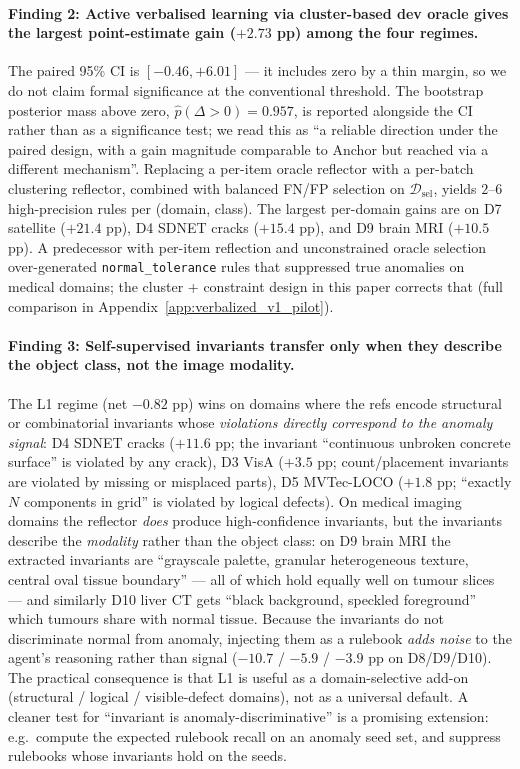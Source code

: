 \paragraph{Finding 2: Active verbalised learning via cluster-based
dev oracle gives the largest point-estimate gain ($+2.73$ pp) among
the four regimes.} The paired 95\% CI is $[-0.46, +6.01]$ --- it
includes zero by a thin margin, so we do not claim formal
significance at the conventional threshold. The bootstrap posterior
mass above zero, $\hat{p}(\Delta{>}0){=}0.957$, is reported
alongside the CI rather than as a significance test; we read this
as ``a reliable direction under the paired design, with a gain
magnitude comparable to Anchor but reached via a different
mechanism''. Replacing a per-item oracle reflector with a per-batch
clustering reflector, combined with balanced FN/FP selection on
$\mathcal{D}_{\mathrm{sel}}$, yields $2$--$6$ high-precision rules
per (domain, class). The largest per-domain gains are on D7
satellite ($+21.4$ pp), D4 SDNET cracks ($+15.4$ pp), and D9 brain
MRI ($+10.5$ pp). A predecessor with per-item reflection and
unconstrained oracle selection over-generated
\texttt{normal\_tolerance} rules that suppressed true anomalies on
medical domains; the cluster + constraint design in this paper
corrects that (full comparison in Appendix~\ref{app:verbalized_v1_pilot}).

\paragraph{Finding 3: Self-supervised invariants transfer only when
they describe the object class, not the image modality.} The L1
regime (net $-0.82$ pp) wins on domains where the refs encode
structural or combinatorial invariants whose \emph{violations
directly correspond to the anomaly signal}: D4 SDNET cracks
($+11.6$ pp; the invariant ``continuous unbroken concrete surface''
is violated by any crack), D3 VisA ($+3.5$ pp; count/placement
invariants are violated by missing or misplaced parts), D5
MVTec-LOCO ($+1.8$ pp; ``exactly $N$ components in grid'' is
violated by logical defects). On medical imaging domains the
reflector \emph{does} produce high-confidence invariants, but the
invariants describe the \emph{modality} rather than the object
class: on D9 brain MRI the extracted invariants are ``grayscale
palette, granular heterogeneous texture, central oval tissue
boundary'' --- all of which hold equally well on tumour slices ---
and similarly D10 liver CT gets ``black background, speckled
foreground'' which tumours share with normal tissue. Because the
invariants do not discriminate normal from anomaly, injecting them
as a rulebook \emph{adds noise} to the agent's reasoning rather
than signal ($-10.7$ / $-5.9$ / $-3.9$ pp on D8/D9/D10). The
practical consequence is that L1 is useful as a domain-selective
add-on (structural / logical / visible-defect domains), not as a
universal default. A cleaner test for ``invariant is
anomaly-discriminative'' is a promising extension: e.g.\ compute
the expected rulebook recall on an anomaly seed set, and suppress
rulebooks whose invariants hold on the seeds.

